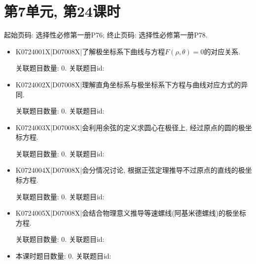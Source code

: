 \section*{第7单元, 第24课时}
起始页码: 选择性必修第一册P76; 终止页码: 选择性必修第一册P78.
\begin{itemize}
\item K0724001X|D07008X|了解极坐标系下曲线与方程$F(\rho,\theta)=0$的对应关系.

关联题目数量: 0. 关联题目id: 

\item K0724002X|D07008X|理解直角坐标系与极坐标系下方程与曲线对应方式的异同.

关联题目数量: 0. 关联题目id: 

\item K0724003X|D07008X|会利用余弦的定义求圆心在极径上, 经过原点的圆的极坐标方程.

关联题目数量: 0. 关联题目id: 

\item K0724004X|D07008X|会分情况讨论, 根据正弦定理推导不过原点的直线的极坐标方程.

关联题目数量: 0. 关联题目id: 

\item K0724005X|D07008X|会结合物理意义推导等速螺线(阿基米德螺线)的极坐标方程.

关联题目数量: 0. 关联题目id: 

\item 本课时题目数量: 0. 关联题目id: 

\end{itemize}

